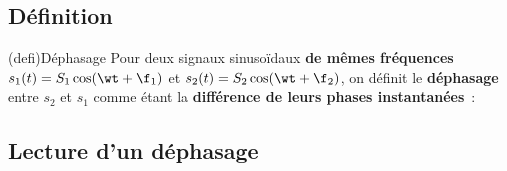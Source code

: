 \documentclass[../../main/main.tex]{subfiles}
\begin{document}
\subsection{Définition}
\begin{tcb}(defi){Déphasage}
	Pour deux signaux sinusoïdaux \textbf{de mêmes fréquences} $s_1(t) =
		S_1\cos(\wt+\f_1)$ et $s_2(t) = S_2\cos(\wt+\f_2)$, on définit le
	\textbf{déphasage} entre $s_2$ et $s_1$ comme étant la \textbf{différence de
		leurs phases instantanées}~:
	\psw{%
		\[
			\D\f_{2/1} = (\wt + \f_2) - (\wt+\f_1)
			\Lra
			\boxed{\D\f_{2/1} = \f_2 - \f_1}
		\]
	}%
	\vspace{-15pt}
\end{tcb}

\subsection{Lecture d'un déphasage}
\end{document}
